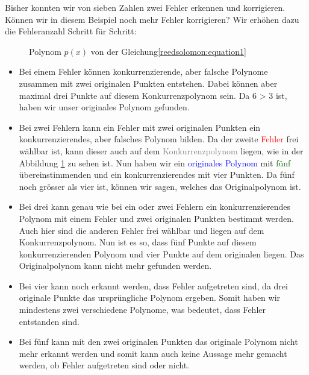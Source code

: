 \begin{beispiel}
Bisher konnten wir von sieben Zahlen zwei Fehler erkennen und korrigieren. Können wir in diesem Beispiel noch mehr Fehler korrigieren? 
Wir erhöhen dazu die Fehleranzahl Schritt für Schritt:
\begin{figure}%
	\centering
    
	\caption{Polynom $p(x)$ von der Gleichung\eqref{reedsolomon:equation1}}
	\label{fig:polynom}
\end{figure}%
\begin{itemize}
    \item[\textit{1 Fehler}:] Bei einem Fehler können konkurrenzierende, aber falsche Polynome zusammen mit zwei originalen Punkten entstehen.
        Dabei können aber maximal drei Punkte auf diesem Konkurrenzpolynom sein.
        Da 6 > 3 ist, haben wir unser originales Polynom gefunden.
    \item[\textit{2 Fehler}:] Bei zwei Fehlern kann ein Fehler mit zwei originalen Punkten ein konkurrenzierendes, aber falsches Polynom bilden.
        Da der zweite \textcolor{red}{Fehler} frei wählbar ist, kann dieser auch auf dem \textcolor{gray}{Konkurrenzpolynom} liegen, wie in der Abbildung \ref{fig:polynom} zu sehen ist.
        Nun haben wir ein \textcolor{blue}{originales Polynom} mit \textcolor{darkgreen}{fünf} übereinstimmenden und ein konkurrenzierendes mit vier Punkten.
        Da fünf noch grösser als vier ist, können wir sagen, welches das Originalpolynom ist.
    \item[\textit{3 Fehler}:] Bei drei kann genau wie bei ein oder zwei Fehlern ein konkurrenzierendes Polynom mit einem Fehler und zwei originalen Punkten bestimmt werden.
        Auch hier sind die anderen Fehler frei wählbar und liegen auf dem Konkurrenzpolynom.
        Nun ist es so, dass fünf Punkte auf diesem konkurrenzierenden Polynom und vier Punkte auf dem originalen liegen.
        Das Originalpolynom kann nicht mehr gefunden werden.
    \item[\textit{4 Fehler}:] Bei vier kann noch erkannt werden, dass Fehler aufgetreten sind, da drei originale Punkte das ursprüngliche Polynom ergeben.
        Somit haben wir mindestens zwei verschiedene Polynome, was bedeutet, dass Fehler entstanden sind.
    \item[\textit{5 Fehler:}] Bei fünf kann mit den zwei originalen Punkten das originale Polynom nicht mehr erkannt werden und 
        somit kann auch keine Aussage mehr gemacht werden, ob Fehler aufgetreten sind oder nicht.
\qedhere
\end{itemize}
\end{beispiel}

